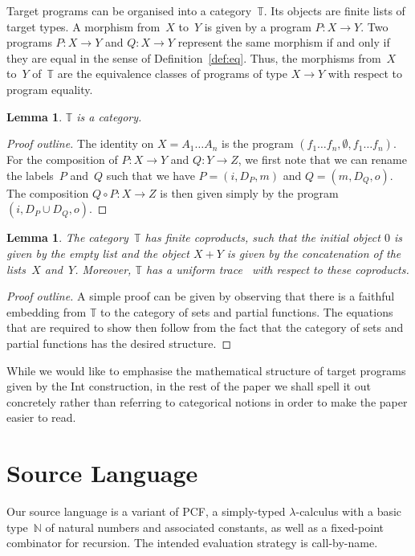 \documentclass{LMCS}
\theoremstyle{definition}
\theoremstyle{plain}
\newtheorem{lemma}[thm]{Lemma}
\newcommand{\NN}{\mathbb{N}}
\newcommand{\TT}{\mathbb{T}}
\begin{document}
Target programs can be organised into a category\/~$\TT$. Its 
objects are finite lists of target types. A morphism 
from~$X$ to~$Y$ is given by a program $P \colon X\to Y$.
Two programs $P \colon X\to Y$ and $Q \colon X\to Y$ represent the same
morphism if and only if they 
are equal in the sense of Definition~\ref{def:eq}.
Thus, the morphisms from~$X$ to~$Y$ of~$\TT$ are the equivalence classes
of programs of type $X\to Y$ with respect to program equality.
\begin{lemma}
  $\TT$ is a category.
\end{lemma}
\begin{proof}[Proof outline]
  The identity on $X = A_1\dots A_n$ is the program 
  $(f_1\dots f_n,\emptyset, f_1\dots f_n)$.
For the composition of $P\colon X \to Y$ and $Q\colon Y \to Z$,
  we first note that we can rename the labels~$P$ and~$Q$ such
  that we have $P=(i,D_P, m)$ and
  $Q=(m,D_Q,o)$.
  The composition $Q\circ P \colon X\to Z$ is then given simply by
  the program $(i, D_P\cup D_Q, o)$.
\end{proof}

\begin{lemma}
  The category\/~$\TT$ has finite coproducts, such that the initial object
  $0$ is given by the empty list and the object $X+Y$ is given by the
  concatenation of the lists~$X$ and~$Y$. Moreover, $\TT$ has 
  a uniform trace~\cite{Hasegawa09} with respect to these coproducts.
\end{lemma}
\begin{proof}[Proof outline]
  A simple proof can be given by observing that there is a faithful
  embedding from $\TT$ to the category of sets and partial functions. 
  The equations that are required to show then follow from the fact
  that the category of sets and partial functions has the desired
  structure.
\end{proof}
While we would like to emphasise the mathematical structure of 
target programs given by the Int construction, in the rest of the 
paper we shall spell it out concretely rather than referring to
categorical notions in order to make the paper easier to read.

\section{Source Language}
\label{sect:source}

Our source language is a variant of PCF,
a simply-typed $\lambda$-calculus with a basic type~$\NN$ 
of natural numbers and associated constants, as well as a 
fixed-point combinator for recursion. The intended evaluation
strategy is call-by-name.
\end{document}

